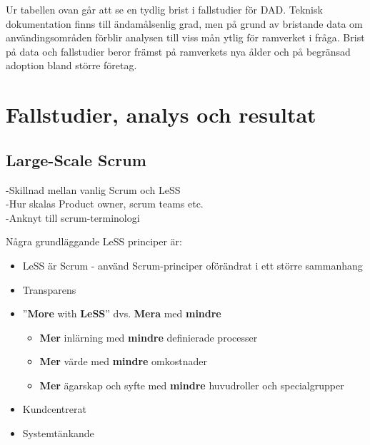 		Ur tabellen ovan går att se en tydlig brist i fallstudier för DAD. Teknisk dokumentation finns till ändamålsenlig grad, men på grund av bristande data om användingsområden förblir analysen till viss mån ytlig för ramverket i fråga.
		Brist på data och fallstudier beror främst på ramverkets nya ålder och på begränsad adoption bland större företag.
	
	
\newpage
\section{Fallstudier, analys och resultat}
	
	
	\subsection{Large-Scale Scrum}
	
		-Skillnad mellan vanlig Scrum och LeSS \\
		-Hur skalas Product owner, scrum teams etc. \\
		-Anknyt till scrum-terminologi
	
		Några grundläggande LeSS principer är: \cite{less_principles}
	
		\begin{itemize}
			\setlength{\itemsep}{1pt}
			\item LeSS är Scrum - använd Scrum-principer oförändrat i ett större sammanhang			
			\item Transparens
			\item ''\textbf{More} with \textbf{LeSS}'' dvs. \textbf{Mera} med \textbf{mindre}
				\begin{itemize}
					\item \textbf{Mer} inlärning med \textbf{mindre} definierade processer
					\item \textbf{Mer} värde med \textbf{mindre} omkostnader
					\item \textbf{Mer} ägarskap och syfte med \textbf{mindre} huvudroller och specialgrupper
				\end{itemize}
			\item Kundcentrerat
			\item Systemtänkande
		\end{itemize}
			
